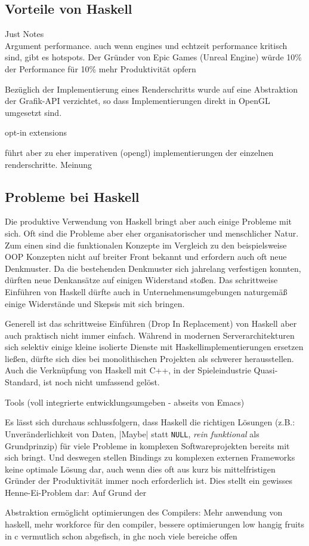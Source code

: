 \subsection{Vorteile von Haskell}

{\Huge Just Notes}\\
Argument performance. auch wenn engines und echtzeit performance kritisch sind, gibt es hotspots.
Der Gründer von Epic Games (Unreal Engine) würde 10\% der Performance für 10\% mehr Produktivität opfern \parencite[Seite 20]{Sweeney2006} %

Bezüglich der Implementierung eines Renderschritts wurde auf eine Abstraktion der Grafik-API verzichtet, so dass Implementierungen direkt in OpenGL umgesetzt sind.

opt-in extensions

führt aber zu eher imperativen (opengl) implementierungen der einzelnen renderschritte. Meinung

\subsection{Probleme bei Haskell}\label{sec:probleme-haskell}

Die produktive Verwendung von Haskell bringt aber auch einige Probleme mit sich. Oft sind die Probleme aber eher organisatorischer und menschlicher Natur. Zum einen sind die funktionalen Konzepte im Vergleich zu den beispielsweise OOP Konzepten nicht auf breiter Front bekannt und erfordern auch oft neue Denkmuster. Da die bestehenden Denkmuster sich jahrelang verfestigen konnten, dürften neue Denkansätze auf einigen Widerstand stoßen. Das schrittweise Einführen von Haskell dürfte auch in Unternehmensumgebungen naturgemäß einige Widerstände und Skepsis mit sich bringen.

Generell ist das schrittweise Einführen (Drop In Replacement) von Haskell aber auch praktisch nicht immer einfach. Während in modernen Serverarchitekturen sich selektiv einige kleine isolierte Dienste mit Haskellimplementierungen ersetzen ließen, dürfte sich dies bei monolithischen Projekten als schwerer herausstellen. Auch die Verknüpfung von Haskell mit C++, in der Spieleindustrie Quasi-Standard, ist noch nicht umfassend gelöst.

Tools (voll integrierte entwicklungsumgeben - abseits von Emacs)


Es lässt sich durchaus schlussfolgern, dass Haskell die richtigen Lösungen (z.B.: Unveränderlichkeit von Daten, |Maybe| statt \texttt{NULL}, \textit{rein funktional} als Grundprinzip) für viele Probleme in komplexen Softwareprojekten bereits mit sich bringt. Und deswegen stellen Bindings zu komplexen externen Frameworks keine optimale Lösung dar, auch wenn dies oft aus kurz bis mittelfristigen Gründer der Produktivität immer noch erforderlich ist. Dies stellt ein gewisses Henne-Ei-Problem dar: Auf Grund der 

Abstraktion ermöglicht optimierungen des Compilers:
Mehr anwendung von haskell, mehr workforce für den compiler, bessere optimierungen
low hangig fruits in c vermutlich schon abgefisch, in ghc noch viele bereiche offen
